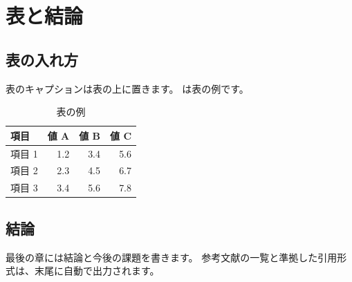 \chapter{表と結論}\label{chap:result}

\section{表の入れ方}
表のキャプションは表の上に置きます。
は表の例です。

\begin{table}[htbp]
  \centering
  \caption{表の例}\label{tab:sample}
  \begin{tabular}{lrrr}
    \hline
    項目   & 値 A & 値 B & 値 C \\
    \hline
    項目 1 & 1.2 & 3.4 & 5.6 \\
    項目 2 & 2.3 & 4.5 & 6.7 \\
    項目 3 & 3.4 & 5.6 & 7.8 \\
    \hline
  \end{tabular}
\end{table}

\section{結論}
最後の章には結論と今後の課題を書きます。
参考文献の一覧と準拠した引用形式は、末尾に自動で出力されます。
